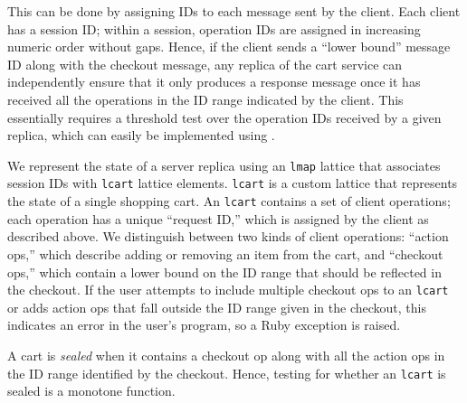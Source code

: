This can be done by assigning IDs to each message sent by the client. Each
client has a session ID; within a session, operation IDs are assigned in
increasing numeric order without gaps. Hence, if the client sends a ``lower
bound'' message ID along with the checkout message, any replica of the cart
service can independently ensure that it only produces a response message once
it has received all the operations in the ID range indicated by the client. This
essentially requires a threshold test over the operation IDs received by a given
replica, which can easily be implemented using \lang.

We represent the state of a server replica using an \texttt{lmap} lattice that
associates session IDs with \texttt{lcart} lattice elements. \texttt{lcart} is a
custom lattice that represents the state of a single shopping cart. An
\texttt{lcart} contains a set of client operations; each operation has a unique
``request ID,'' which is assigned by the client as described above. We
distinguish between two kinds of client operations: ``action ops,'' which
describe adding or removing an item from the cart, and ``checkout ops,'' which
contain a lower bound on the ID range that should be reflected in the
checkout. If the user attempts to include multiple checkout ops to an \texttt{lcart}
or adds action ops that fall outside the ID range given in the checkout, this
indicates an error in the user's program, so a Ruby exception is raised.

A cart is \emph{sealed} when it contains a checkout op along with all the action
ops in the ID range identified by the checkout. Hence, testing for whether an
\texttt{lcart} is sealed is a monotone function.


